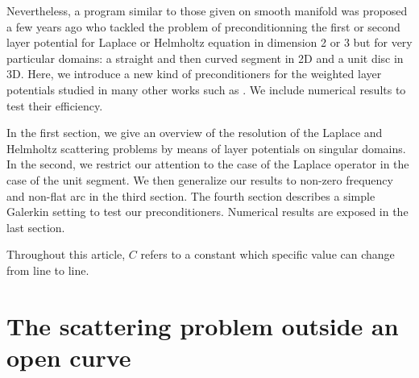 \documentclass[a4paper]{article}
\begin{document}
	Nevertheless, a program similar to those given on smooth manifold was proposed a few years ago \cite{Bruno,Nedelec,Jerez,Hiptmair} who tackled the problem of preconditionning the first or second layer potential
	for Laplace or Helmholtz equation in dimension 2 or 3 but for very particular domains: a straight and then curved segment in 2D and a unit disc in 3D. Here, we introduce a new kind of preconditioners for the weighted layer potentials studied in many other works such as \cite{bruno2012second}. We include numerical results to test their efficiency. 
		
	In the first section, we give an overview of the resolution of the Laplace and Helmholtz scattering problems by means of layer potentials on singular domains. In the second, we restrict our attention to the case of the Laplace operator in the case of the unit segment. We then generalize our results to non-zero frequency and non-flat arc in the third section. The fourth section describes a simple Galerkin setting to test our preconditioners. Numerical results are exposed in the last section. 
	
	
	
	Throughout this article, $C$ refers to a constant which specific value can change from line to line. 
	
	\section{The scattering problem outside an open curve}
	
\end{document}
